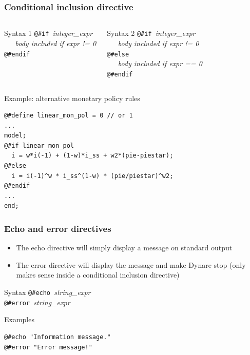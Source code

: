 \documentclass{beamer}
\begin{document}
\begin{frame}[fragile=singleslide]
  \frametitle{Conditional inclusion directive}

  \begin{columns}[T]
    \begin{block}{Syntax 1}
\verb+@#if +\textit{integer\_expr} \\
\verb+   +\textit{body included if expr != 0} \\
\verb+@#endif+
    \end{block}

    \begin{block}{Syntax 2}
\verb+@#if +\textit{integer\_expr} \\
\verb+   +\textit{body included if expr != 0} \\
\verb+@#else+ \\
\verb+   +\textit{body included if expr == 0} \\
\verb+@#endif+
    \end{block}
  \end{columns}

  \begin{block}{Example: alternative monetary policy rules}
    \scriptsize
\begin{verbatim}
@#define linear_mon_pol = 0 // or 1
...
model;
@#if linear_mon_pol
  i = w*i(-1) + (1-w)*i_ss + w2*(pie-piestar);
@#else
  i = i(-1)^w * i_ss^(1-w) * (pie/piestar)^w2;
@#endif
...
end;
\end{verbatim}
    \scriptsize
  \end{block}
\end{frame}

\begin{frame}[fragile=singleslide]
  \frametitle{Echo and error directives}

  \begin{itemize}
  \item The echo directive will simply display a message on standard output
  \item The error directive will display the message and make Dynare stop (only makes sense inside a conditional inclusion directive)
  \end{itemize}

  \begin{block}{Syntax}
\verb+@#echo +\textit{string\_expr} \\
\verb+@#error +\textit{string\_expr}
  \end{block}

  \begin{block}{Examples}
\begin{verbatim}
@#echo "Information message."
@#error "Error message!"
\end{verbatim}
  \end{block}
\end{frame}
\end{document}
